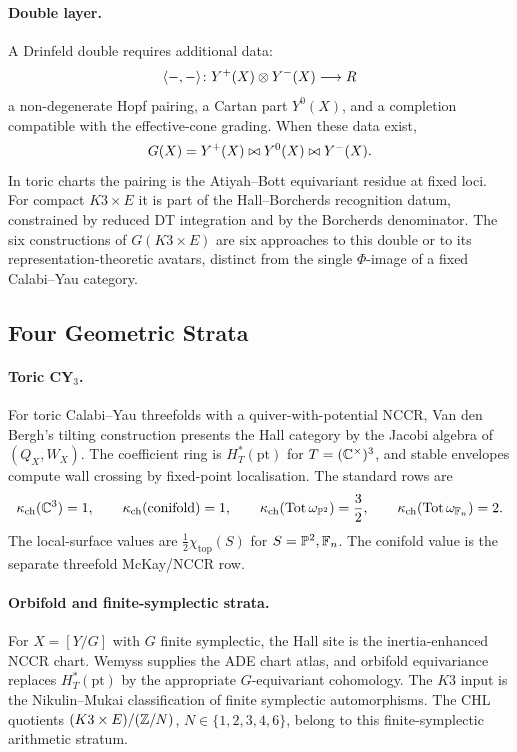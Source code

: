 \paragraph{Double layer.}
A Drinfeld double requires additional data:
\[
  \langle-,-\rangle\colon Y^{+}(X)\otimes Y^{-}(X)\longrightarrow R
\]
a non-degenerate Hopf pairing, a Cartan part \(Y^0(X)\), and a
completion compatible with the effective-cone grading. When these data
exist,
\[
  G(X)=Y^{+}(X)\bowtie Y^0(X)\bowtie Y^{-}(X).
\]
In toric charts the pairing is the Atiyah--Bott equivariant residue at
fixed loci. For compact \(K3\times E\) it is part of the
Hall--Borcherds recognition datum, constrained by reduced DT
integration and by the Borcherds denominator. The six constructions of
\(G(K3\times E)\) are six approaches to this double or to its
representation-theoretic avatars, distinct from the single
\(\Phi\)-image of a fixed Calabi--Yau category.

\subsection*{Four Geometric Strata}

\paragraph{Toric CY\(_3\).}
For toric Calabi--Yau threefolds with a quiver-with-potential NCCR,
Van den Bergh's tilting construction presents the Hall category by the
Jacobi algebra of \((Q_X,W_X)\). The coefficient ring is
\(H_T^*(\mathrm{pt})\) for \(T=(\mathbb{C}^{\times})^3\), and stable envelopes
compute wall crossing by fixed-point localisation. The standard rows
are
\[
  \kappa_{\mathrm{ch}}(\mathbb{C}^3)=1,\qquad
  \kappa_{\mathrm{ch}}(\mathrm{conifold})=1,\qquad
  \kappa_{\mathrm{ch}}(\mathrm{Tot}\,\omega_{\mathbb{P}^2})=\frac32,\qquad
  \kappa_{\mathrm{ch}}(\mathrm{Tot}\,\omega_{\mathbb{F}_n})=2.
\]
The local-surface values are
\(\frac12\chi_{\mathrm{top}}(S)\) for \(S=\mathbb{P}^2,\mathbb{F}_n\). The conifold
value is the separate threefold McKay/NCCR row.

\paragraph{Orbifold and finite-symplectic strata.}
For \(X=[Y/G]\) with \(G\) finite symplectic, the Hall site is the
inertia-enhanced NCCR chart. Wemyss supplies the ADE chart atlas, and
orbifold equivariance replaces \(H_T^*(\mathrm{pt})\) by the
appropriate \(G\)-equivariant cohomology. The \(K3\) input is the
Nikulin--Mukai classification of finite symplectic automorphisms. The
CHL quotients \((K3\times E)/(\mathbb{Z}/N)\), \(N\in\{1,2,3,4,6\}\), belong to
this finite-symplectic arithmetic stratum.

